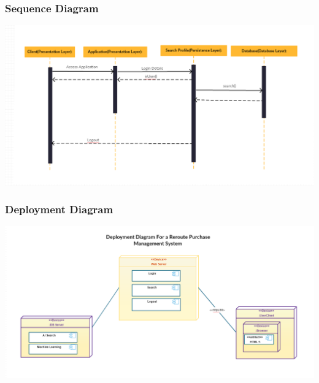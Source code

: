 \documentclass[a4paper,10pt]{article}
\begin{document}
	\subsubsection {Sequence Diagram}
		 \includegraphics[scale=0.62]{Diagrams/SequenceDiagram.png}\\
	
	\subsubsection {Deployment Diagram}
		 \includegraphics[scale=0.62]{Diagrams/Deployment Diagram.png}\\
		
		
\end{document}
